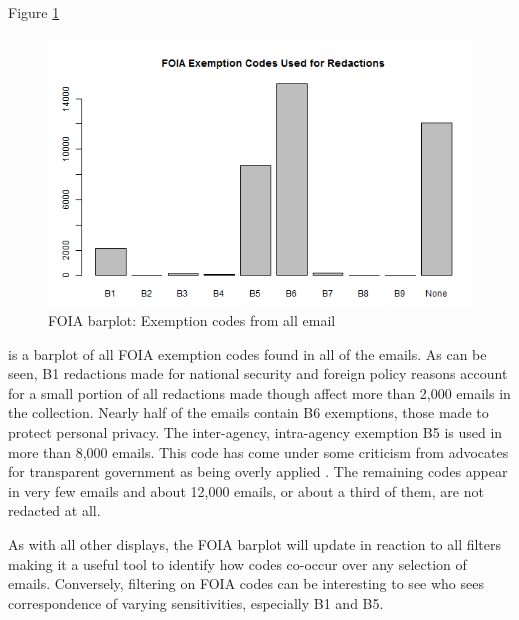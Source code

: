 \documentclass[journal]{vgtc}                %
\begin{document}
Figure \ref{fig:FOIAcodes}
\begin{figure}[h]
\begin{center}
\includegraphics[width=0.95\linewidth]{ExemptionsFullTime}
\caption{FOIA barplot: Exemption codes from all email}
\label{fig:FOIAcodes}
\end{center}
\end{figure}
is a barplot of all FOIA exemption codes found in all of the emails.  As can be seen, B1 redactions made for national security and foreign policy reasons account for a small portion of all redactions made though affect more than 2,000 emails in the collection.   Nearly half of the emails contain B6 exemptions, those made to protect personal privacy.   The inter-agency, intra-agency exemption B5 is used in more than 8,000 emails.  This code has come under some criticism from advocates for transparent government as being overly applied \cite{unredactedB5}.  The remaining codes appear in very few emails and about 12,000 emails, or about a third of them, are not redacted at all.

As with all other displays, the FOIA barplot will update in reaction to all filters making it a useful tool to identify how codes co-occur over any selection of emails.  Conversely, filtering on FOIA codes can be interesting to see who sees correspondence of varying sensitivities, especially B1 and B5.
\end{document}
